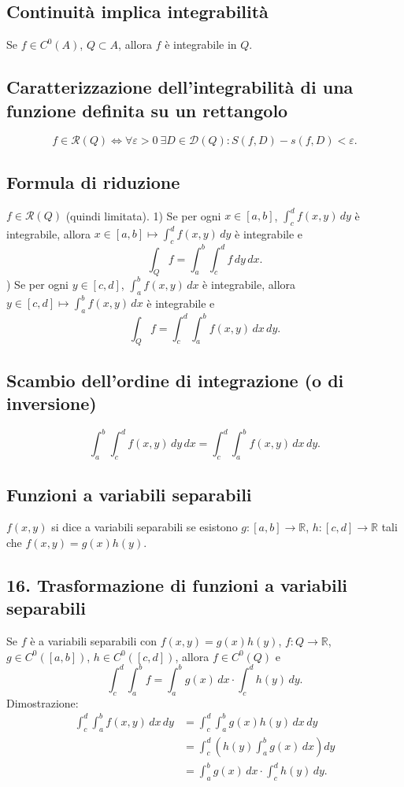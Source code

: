 \documentclass[11pt,a4paper]{article}
\newcommand{\R}{\mathbb R}\newcommand{\N}{\mathbb N}\newcommand{\pagina}[1]{\clearpage}
\begin{document}
\subsection*{Continuità implica integrabilità}
Se $f\in C^0(A)$, $Q\subset A$, allora $f$ è integrabile in $Q$.
\subsection*{Caratterizzazione dell'integrabilità di una funzione definita su un rettangolo}
\[f\in\mathcal R(Q)\iff\forall\varepsilon>0\ \exists D\in\mathcal D(Q):S(f,D)-s(f,D)<\varepsilon.\]
\subsection*{Formula di riduzione}
$f\in\mathcal R(Q)$ (quindi limitata).
1) Se per ogni $x\in[a,b]$, $\int_c^d f(x,y)\,dy$ è integrabile, allora $x\in[a,b]\mapsto\int_c^d f(x,y)\,dy$ è integrabile e
\[\int_Qf=\int_a^b\int_c^d f\,dy\,dx.\]
\pagina{37}
2) Se per ogni $y\in[c,d]$, $\int_a^b f(x,y)\,dx$ è integrabile, allora $y\in[c,d]\mapsto\int_a^b f(x,y)\,dx$ è integrabile e
\[\int_Qf=\int_c^d\int_a^b f(x,y)\,dx\,dy.\]
\subsection*{Scambio dell'ordine di integrazione (o di inversione)}
\[\int_a^b\int_c^d f(x,y)\,dy\,dx=\int_c^d\int_a^b f(x,y)\,dx\,dy.\]
\subsection*{Funzioni a variabili separabili}
$f(x,y)$ si dice a variabili separabili se esistono $g:[a,b]\to\R$, $h:[c,d]\to\R$ tali che $f(x,y)=g(x)h(y)$.
\subsection*{16. Trasformazione di funzioni a variabili separabili}
Se $f$ è a variabili separabili con $f(x,y)=g(x)h(y)$, $f:Q\to\R$, $g\in C^0([a,b])$, $h\in C^0([c,d])$, allora $f\in C^0(Q)$ e
\[\int_c^d\int_a^b f=\int_a^b g(x)\,dx\cdot\int_c^d h(y)\,dy.\]
Dimostrazione:
\begin{align*}
\int_c^d\int_a^b f(x,y)\,dx\,dy&=\int_c^d\int_a^b g(x)h(y)\,dx\,dy\\
&=\int_c^d\left(h(y)\int_a^b g(x)\,dx\right)dy\\
&=\int_a^b g(x)\,dx\cdot\int_c^d h(y)\,dy.
\end{align*}
\pagina{38}
\end{document}
